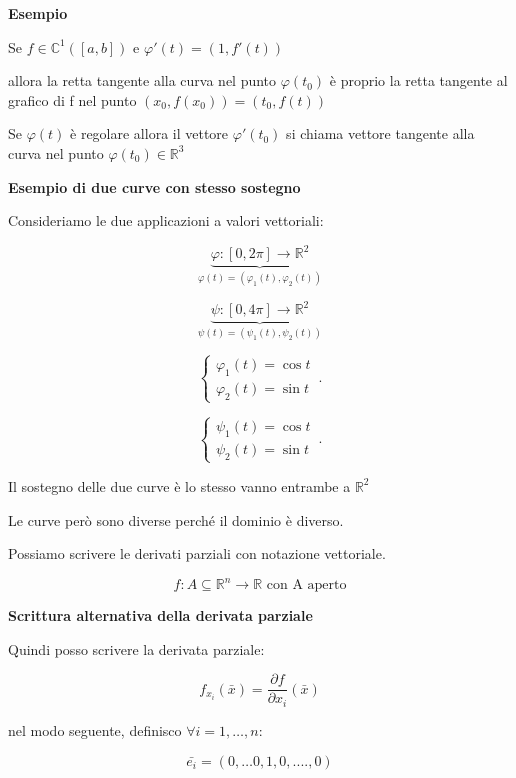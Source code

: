 \documentclass[11pt]{article}
\begin{document}
\textbf{Esempio} 

Se $f \in \mathbb{C}^{1}([a,b])$ e $\varphi'(t) = (1,f'(t))$

allora la retta tangente alla curva nel punto $\varphi(t_0)$ è proprio la retta tangente al grafico di f nel punto $(x_0,f(x_0))=(t_0,f(t))$

Se $\varphi(t)$ è regolare allora il vettore $\varphi'(t_0)$ si chiama vettore tangente alla curva nel punto $\varphi(t_0) \in \mathbb{R}^{3}$

\textbf{Esempio di due curve con stesso sostegno} 

Consideriamo le due applicazioni a valori vettoriali:

\[
    \underbrace{\varphi:[0,2\pi] \rightarrow \mathbb{R}^{2}}_{\varphi(t) = (\varphi_1(t),\varphi_2(t))}
\]

\[
    \underbrace{\psi: [0,4\pi] \rightarrow  \mathbb{R}^{2}}_{\psi(t) = (\psi_1(t),\psi_2(t))}
\]


\begin{equation}
    \begin{cases}
           \varphi_1(t) = \cos t\\
           \varphi_2(t) = \sin t
    \end{cases}\,.
\end{equation}


\begin{equation}
    \begin{cases}
           \psi_1(t) = \cos t\\
           \psi_2(t) = \sin t
    \end{cases}\,.
\end{equation}

Il sostegno delle due curve è lo stesso vanno entrambe a $\mathbb{R}^{2}$

Le curve però sono diverse perché il dominio è diverso.


Possiamo scrivere le derivati parziali con notazione vettoriale.

\[
    f: A\subseteq \mathbb{R}^{n}\rightarrow \mathbb{R} \text{ con A aperto}
\]

\textbf{Scrittura alternativa della derivata parziale} 

Quindi posso scrivere la derivata parziale:

\[
f_{x_i} (\bar{x} ) = \frac{\partial f}{\partial x_i}(\bar{x} )
\]

nel modo seguente, definisco $\forall i = 1, \ldots ,n$:

\[
    \bar{e_i}  = (0, \ldots 0,1,0,....,0) 
\]
\end{document}
